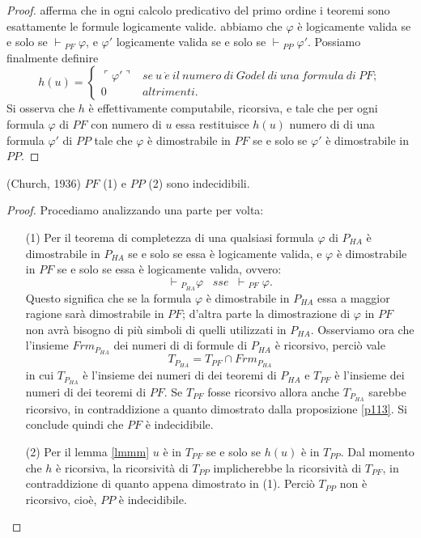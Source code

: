 \begin{proof}
{afferma che in ogni calcolo predicativo del primo ordine i teoremi sono esattamente
le formule logicamente valide.} abbiamo che $\varphi$ è logicamente valida 
se e solo se $\vdash \!\! _{PF} \; \varphi$, e $\varphi'$  logicamente valida 
se e solo se $\vdash \!\! _{PP} \; \varphi'$. Possiamo finalmente definire
$$h(u)=\left\{ \begin{array}{ll}
  \ulcorner \varphi' \urcorner & se\ u\ \grave{e}\ il\ numero\ di\ G\ddot{o}del\ di\ una\ formula\ di\ PF;\\
  0 & altrimenti.\end{array}\right.$$
Si osserva che $h$ è effettivamente computabile, ricorsiva, e tale che per ogni formula
 $\varphi$ di $PF$ con numero di \godel
$u$ essa restituisce $h(u)$  numero di \godel di una formula $\varphi'$ di $PP$  tale che $\varphi$ è dimostrabile
in $PF$ se e solo se  $\varphi'$ è dimostrabile in $PP$.
\end{proof}

\begin{thm}
\label{thmch}
(Church, 1936) $PF$ (1) e $PP$ (2) sono indecidibili.
\end{thm}

\begin{proof}
Procediamo analizzando una parte per volta:
 \begin{itemize}
  \item [(1)] Per il teorema di completezza di \godel una qualsiasi formula $\varphi$ di $P_{HA}$
è dimostrabile in $P_{HA}$ se e solo se essa è logicamente valida, e $\varphi$ è dimostrabile in 
$PF$ se e solo se essa è logicamente valida, ovvero:
$$ \vdash \!\! _{P_{HA}}  \varphi \;\;\; sse \;\; \vdash \!\! _{PF} \; \varphi. $$
Questo significa che se la formula $\varphi$ è dimostrabile in $P_{HA}$ essa a maggior ragione
sarà dimostrabile in $PF$; d'altra parte la dimostrazione di $\varphi$ in $PF$ non avrà
bisogno di più simboli di quelli utilizzati in $P_{HA}.$ \newline
Osserviamo ora che l'insieme $Frm_{P_{HA}}$ dei numeri di \godel di formule di $P_{HA}$ è ricorsivo,
perciò vale
$$T_{P_{HA}} = T_{PF} \cap  Frm_{P_{HA}}$$
in cui $T_{P_{HA}}$ è l'insieme dei numeri di \godel dei teoremi di $P_{HA}$ e
$T_{PF}$ è l'insieme dei numeri di \godel dei teoremi di $PF$. Se $T_{PF}$
fosse ricorsivo allora anche $T_{P_{HA}}$ sarebbe ricorsivo, in contraddizione a quanto 
dimostrato dalla proposizione \ref{p113}. \newline 
Si conclude quindi che $PF$ è indecidibile.
  \item [(2)] Per il lemma \ref{lmmm} $u$ è in $T_{PF}$ se e solo se $h(u)$ è in $T_{PP}$.
Dal momento che $h$ è ricorsiva, la ricorsività di $T_{PP}$ implicherebbe la ricorsività 
di $T_{PF}$, in contraddizione di quanto appena dimostrato in (1). Perciò $T_{PP}$ non è
ricorsivo, cioè, $PP$ è indecidibile. 
 \end{itemize}
\end{proof}

